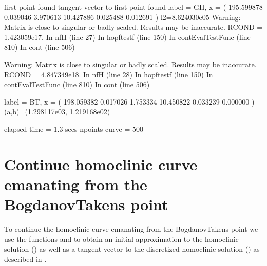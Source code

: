 \documentclass[letterpaper,10pt,english]{jupyterBook}
\begin{document}
\begin{sphinxVerbatim}[commandchars=\\\{\}]
first point found
tangent vector to first point found
label = GH, x = ( 195.599878 0.039046 3.970613 10.427886 0.025488 0.012691 )
l2=\PYGZhy{}8.624030e\PYGZhy{}05
Warning: Matrix is close to singular or badly scaled. Results may be inaccurate. RCOND =  1.423059e\PYGZhy{}17.
\PYGZgt{} In nf\PYGZus{}H (line 27)
In hopf\PYGZgt{}testf (line 150)
In cont\PYGZgt{}EvalTestFunc (line 810)
In cont (line 506)

Warning: Matrix is close to singular or badly scaled. Results may be inaccurate. RCOND =  4.847349e\PYGZhy{}18.
\PYGZgt{} In nf\PYGZus{}H (line 28)
In hopf\PYGZgt{}testf (line 150)
In cont\PYGZgt{}EvalTestFunc (line 810)
In cont (line 506)

label = BT, x = ( 198.059382 0.017026 1.753334 10.450822 0.033239 0.000000 )
(a,b)=(\PYGZhy{}1.298117e\PYGZhy{}03, 1.219168e\PYGZhy{}02)

elapsed time  = 1.3 secs
npoints curve = 500
\end{sphinxVerbatim}


\section{Continue homoclinic curve emanating from the Bogdanov\sphinxhyphen{}Takens point}
\label{\detokenize{SIRmodel:continue-homoclinic-curve-emanating-from-the-bogdanov-takens-point}}
\sphinxAtStartPar
To continue the homoclinic curve emanating from the Bogdanov\sphinxhyphen{}Takens point we
use the functions  and  to obtain an initial
approximation to the homoclinic solution () as well as a tangent vector
to the discretized homoclinic solution () as described in
{\hyperref[\detokenize{Morris-Lecar:initial-prediction-homoclinic-orbit}]{}}.
\end{document}
